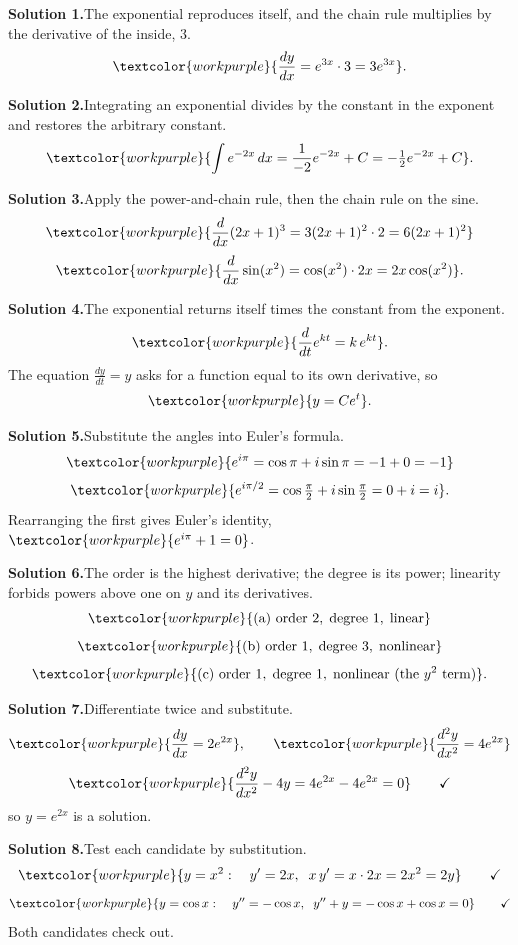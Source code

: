 \noindent\textbf{Solution 1.}\quad The exponential reproduces itself, and the
chain rule multiplies by the derivative of the inside, $3$.
\[ \textcolor{workpurple}{\frac{dy}{dx} = e^{3x}\cdot 3 = 3e^{3x}}. \]

\medskip
\noindent\textbf{Solution 2.}\quad Integrating an exponential divides by the
constant in the exponent and restores the arbitrary constant.
\[ \textcolor{workpurple}{\int e^{-2x}\,dx = \frac{1}{-2}e^{-2x} + C = -\tfrac{1}{2}e^{-2x} + C}. \]

\medskip
\noindent\textbf{Solution 3.}\quad Apply the power-and-chain rule, then the
chain rule on the sine.
\[ \textcolor{workpurple}{\frac{d}{dx}(2x+1)^{3} = 3(2x+1)^{2}\cdot 2 = 6(2x+1)^{2}} \]
\[ \textcolor{workpurple}{\frac{d}{dx}\sin(x^{2}) = \cos(x^{2})\cdot 2x = 2x\cos(x^{2})}. \]

\medskip
\noindent\textbf{Solution 4.}\quad The exponential returns itself times the
constant from the exponent.
\[ \textcolor{workpurple}{\frac{d}{dt}e^{kt} = k\,e^{kt}}. \]
The equation $\frac{dy}{dt} = y$ asks for a function equal to its own derivative,
so
\[ \textcolor{workpurple}{y = Ce^{t}}. \]

\medskip
\noindent\textbf{Solution 5.}\quad Substitute the angles into Euler's formula.
\[ \textcolor{workpurple}{e^{i\pi} = \cos\pi + i\sin\pi = -1 + 0 = -1} \]
\[ \textcolor{workpurple}{e^{i\pi/2} = \cos\tfrac{\pi}{2} + i\sin\tfrac{\pi}{2} = 0 + i = i}. \]
Rearranging the first gives Euler's identity,
$\textcolor{workpurple}{e^{i\pi} + 1 = 0}$.

\medskip
\noindent\textbf{Solution 6.}\quad The order is the highest derivative; the
degree is its power; linearity forbids powers above one on $y$ and its
derivatives.
\[ \textcolor{workpurple}{\text{(a) order } 2,\; \text{degree } 1,\; \text{linear}} \]
\[ \textcolor{workpurple}{\text{(b) order } 1,\; \text{degree } 3,\; \text{nonlinear}} \]
\[ \textcolor{workpurple}{\text{(c) order } 1,\; \text{degree } 1,\; \text{nonlinear (the } y^{2} \text{ term)}}. \]

\medskip
\noindent\textbf{Solution 7.}\quad Differentiate twice and substitute.
\[ \textcolor{workpurple}{\frac{dy}{dx} = 2e^{2x}}, \qquad
   \textcolor{workpurple}{\frac{d^{2}y}{dx^{2}} = 4e^{2x}} \]
\[ \textcolor{workpurple}{\frac{d^{2}y}{dx^{2}} - 4y = 4e^{2x} - 4e^{2x} = 0} \qquad\checkmark \]
so $y = e^{2x}$ is a solution.

\medskip
\noindent\textbf{Solution 8.}\quad Test each candidate by substitution.
\[ \textcolor{workpurple}{y = x^{2}: \quad y' = 2x, \;\; x\,y' = x\cdot 2x = 2x^{2} = 2y} \qquad\checkmark \]
\[ \textcolor{workpurple}{y = \cos x: \quad y'' = -\cos x, \;\; y'' + y = -\cos x + \cos x = 0} \qquad\checkmark \]
Both candidates check out.


